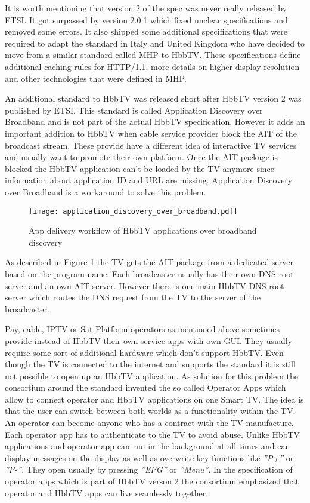 It is worth mentioning that version 2 of the spec was never really released by ETSI. It got
surpassed by version 2.0.1 which fixed unclear specifications and removed some errors. It also
shipped some additional specifications that were required to adapt the standard in Italy and United
Kingdom who have decided to move from a similar standard called MHP to HbbTV. These specifications
define additional caching rules for HTTP/1.1, more details on higher display resolution and other
technologies that were defined in MHP.

An additional standard to HbbTV was released short after HbbTV version 2 was published by ETSI.
This standard is called Application Discovery over Broadband and is not part of the actual
HbbTV specification. However it adds an important addition to HbbTV when cable service provider block
the AIT of the broadcast stream. These provide have a different idea of interactive TV services
and usually want to promote their own platform. Once the AIT package is blocked the HbbTV application
can't be loaded by the TV anymore since information about application ID and URL are missing.
Application Discovery over Broadband is a workaround to solve this problem.

\begin{figure}[htb]
  \centering
  \texttt{[image: application\_discovery\_over\_broadband.pdf]}\\
  \caption{App delivery workflow of HbbTV applications over broadband discovery}\label{fig:application_discovery_over_broadband}
\end{figure}

As described in Figure \ref{fig:application_discovery_over_broadband} the TV gets the AIT package
from a dedicated server based on the program name. Each broadcaster usually has their own DNS
root server and an own AIT server. However there is one main HbbTV DNS root server which routes the
DNS request from the TV to the server of the broadcaster.

Pay, cable, IPTV or Sat-Platform operators as mentioned above sometimes provide instead of HbbTV
their own service apps with own GUI. They usually require some sort of additional hardware which
don't support HbbTV. Even though the TV is connected to the internet and supports the standard
it is still not possible to open up an HbbTV application. As solution for this problem the
consortium around the standard invented the so called Operator Apps which allow to connect
operator and HbbTV applications on one Smart TV. The idea is that the user can switch between
both worlds as a functionality within the TV. An operator can become anyone who has a contract
with the TV manufacture. Each operator app has to authenticate to the TV to avoid abuse. Unlike
HbbTV applications and operator app can run in the background at all times and can display
messages on the display as well as overwrite key functions like \textit{''P+''} or \textit{''P-''}.
They open usually by pressing \textit{''EPG''} or \textit{''Menu''}. In the specification of
operator apps which is part of HbbTV verson 2 the consortium emphasized that operator and HbbTV
apps can live seamlessly together.

